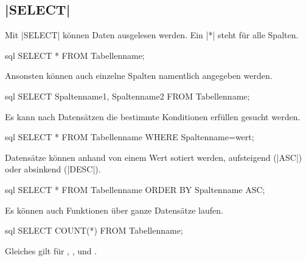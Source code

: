 \documentclass{article}
\begin{document}
\subsection{\ilsourcecode[sql]|SELECT|}
Mit \ilsourcecode[sql]|SELECT| können Daten ausgelesen werden. Ein \ilsourcecode[sql]|*| steht für alle Spalten.
\begin{sourcecode}{sql}
SELECT * FROM Tabellenname;
\end{sourcecode}
Ansonsten können auch einzelne Spalten namentlich angegeben werden.
\begin{sourcecode}{sql}
SELECT Spaltenname1, Spaltenname2 FROM Tabellenname;
\end{sourcecode}
Es kann nach Datensätzen die bestimmte Konditionen erfüllen gesucht werden.
\begin{sourcecode}{sql}
SELECT * FROM Tabellenname WHERE Spaltenname=wert;
\end{sourcecode}
Datensätze können anhand von einem Wert sotiert werden, aufsteigend (\ilsourcecode[sql]|ASC|) oder absinkend (\ilsourcecode[sql]|DESC|).
\begin{sourcecode}{sql}
SELECT * FROM Tabellenname ORDER BY Spaltenname ASC;
\end{sourcecode}
Es können auch Funktionen über ganze Datensätze laufen.
\begin{sourcecode}{sql}
SELECT COUNT(*) FROM Tabellenname;
\end{sourcecode}
Gleiches gilt für , ,  und .
\end{document}
